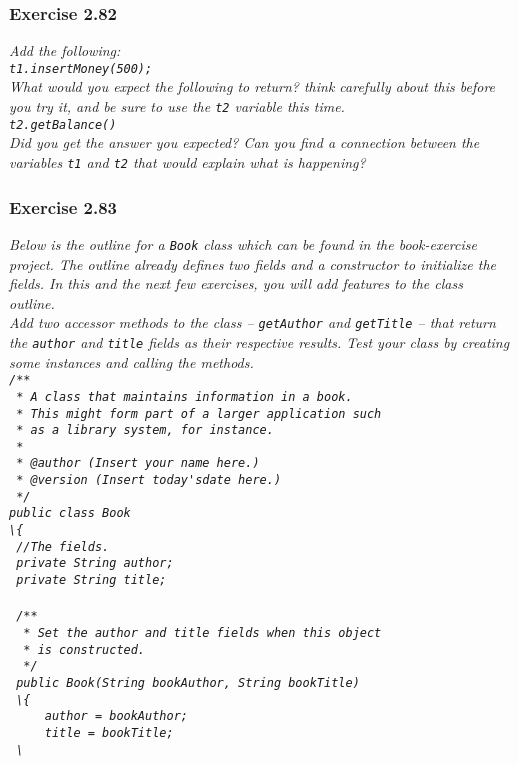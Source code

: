 \subsubsection*{Exercise 2.82}
\textit{Add the following: \\
\lstinline{t1.insertMoney(500);}\\
What would you expect the following to return? think carefully about this 
before you try it, and be sure to use the \lstinline{t2} variable this time. \\
\lstinline{t2.getBalance()}\\
Did you get the answer you expected? Can you find a connection between the 
variables \lstinline{t1} and \lstinline{t2} that would explain what is 
happening? }\\

\subsubsection*{Exercise 2.83}
\textit{Below is the outline for a \lstinline{Book} class which can be found 
in the book-exercise project. The outline already defines two fields and a 
constructor to initialize the fields. In this and the next few exercises, you 
will add features to the class outline. \\
Add two accessor methods to the class -- \lstinline{getAuthor} and 
\lstinline{getTitle} -- that return the \lstinline{author} and 
\lstinline{title} fields as their respective results. Test your class by 
creating some instances and calling the methods. \\
\lstinline{/**}\\
\lstinline{ * A class that maintains information in a book.}\\
\lstinline{ * This might form part of a larger application such}\\
\lstinline{ * as a library system, for instance.}\\
\lstinline{ *}\\
\lstinline{ * @author (Insert your name here.)}\\
\lstinline{ * @version (Insert today'sdate here.)}\\
\lstinline{ */}\\
\lstinline{public class Book}\\
\lstinline{\{}\\
\lstinline{	//The fields.}\\
\lstinline{	private String author;}\\
\lstinline{	private String title;}\\
\\
\lstinline{	/**}\\
\lstinline{	 * Set the author and title fields when this object}\\
\lstinline{	 * is constructed.}\\
\lstinline{	 */}\\
\lstinline{	public Book(String bookAuthor, String bookTitle)}\\
\lstinline{	\{}\\
\lstinline{		author = bookAuthor;}\\
\lstinline{		title = bookTitle;}\\
\lstinline{	\}}\\
